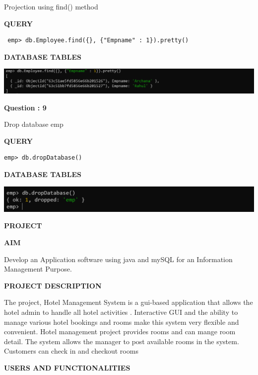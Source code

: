 \documentclass[a4paper,12pt]{report}
\begin{document}
Projection using find() method
\begin{flushleft}
\textbf{QUERY }
\end{flushleft}
 \begin{verbatim}
 emp> db.Employee.find({}, {"Empname" : 1}).pretty()
\end{verbatim}
\begin{flushleft}
\textbf{DATABASE TABLES}
\end{flushleft}
\includegraphics[scale=0.386]{M9copy.png}
\begin{flushleft}
    \textbf{Question : 9}
\end{flushleft}
Drop database emp
\begin{flushleft}
\textbf{QUERY }
\end{flushleft}
 \begin{verbatim}
emp> db.dropDatabase()
\end{verbatim}
\begin{flushleft}
\textbf{DATABASE TABLES}
\end{flushleft}

\includegraphics[scale=0.53]{M10.png}

\newpage
\begin{center}
		\large\textbf{PROJECT}
	\end{center}
	
	\begin{flushleft}
		\textbf{AIM }
	\end{flushleft} 
	 Develop an Application software using java and mySQL for an Information Management Purpose.

\begin{flushleft}
    \textbf{PROJECT DESCRIPTION}
\end{flushleft}
The project, Hotel Management System is a gui-based application that allows the hotel admin to handle all hotel activities . Interactive GUI and the ability to manage various hotel bookings and rooms make this system very flexible and convenient. Hotel management project provides rooms and can mange room detail. The system allows the manager to post available rooms in the system. Customers can check in and checkout rooms
	\begin{flushleft}
		\textbf{USERS AND FUNCTIONALITIES }
	\end{flushleft}
\end{document}
